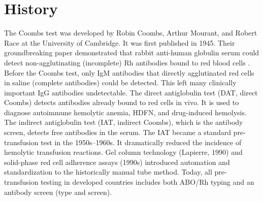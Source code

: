 \section*{History}
The Coombs test was developed by Robin Coombs, Arthur Mourant, and Robert Race at the University of Cambridge. It was first published in 1945. Their groundbreaking paper demonstrated that rabbit anti-human globulin serum could detect non-agglutinating (incomplete) Rh antibodies bound to red blood cells \cite{coombs1945new}. Before the Coombs test, only IgM antibodies that directly agglutinated red cells in saline (complete antibodies) could be detected. This left many clinically important IgG antibodies undetectable. The direct antiglobulin test (DAT, direct Coombs) detects antibodies already bound to red cells in vivo. It is used to diagnose autoimmune hemolytic anemia, HDFN, and drug-induced hemolysis. The indirect antiglobulin test (IAT, indirect Coombs), which is the antibody screen, detects free antibodies in the serum. The IAT became a standard pre-transfusion test in the 1950s--1960s. It dramatically reduced the incidence of hemolytic transfusion reactions. Gel column technology (Lapierre, 1990) and solid-phase red cell adherence assays (1990s) introduced automation and standardization to the historically manual tube method. Today, all pre-transfusion testing in developed countries includes both ABO/Rh typing and an antibody screen (type and screen).

